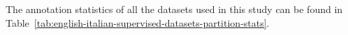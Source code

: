 \documentclass[11pt]{article}
\begin{document}
The annotation statistics of all the datasets used in this study can be found in Table~\ref{tab:english-italian-supervised-datasets-partition-stats}.


\end{document}
